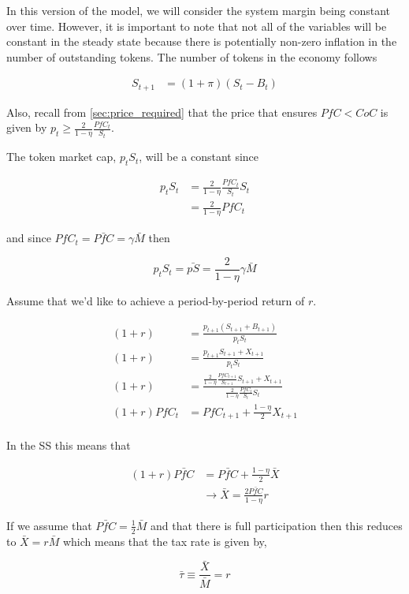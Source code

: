 
In this version of the model, we will consider the system margin being constant over time. However,
it is important to note that not all of the variables will be constant in the steady state because
there is potentially non-zero inflation in the number of outstanding tokens. The number of tokens in
the economy follows

\begin{align*}
  S_{t+1} &= (1 + \pi) (S_t - B_t)
\end{align*}

Also, recall from \ref{sec:price_required} that the price that ensures $PfC < CoC$ is given by
$p_t \geq \frac{2}{1 - \eta} \frac{PfC_t}{S_t}$.

The token market cap, $p_t S_t$, will be a constant since

\begin{align*}
  p_t S_t &= \frac{2}{1 - \eta} \frac{PfC_t}{S_t} S_t \\
  &= \frac{2}{1 - \eta} PfC_t
\end{align*}

and since $PfC_t = \bar{PfC} = \gamma \bar{M}$ then

$$p_t S_t = \bar{pS} = \frac{2}{1 - \eta} \gamma \bar{M}$$

Assume that we'd like to achieve a period-by-period return of $r$.

\begin{align*}
  (1 + r) &= \frac{p_{t+1} (S_{t+1} + B_{t+1})}{p_t S_t} \\
  (1 + r) &= \frac{p_{t+1} S_{t+1} + X_{t+1}}{p_t S_t} \\
  (1 + r) &= \frac{\frac{2}{1 - \eta} \frac{PfC_{t+1}}{S_{t+1}} S_{t+1} + X_{t+1}}{\frac{2}{1 - \eta} \frac{PfC_{t}}{S_t} S_t} \\
  (1 + r) PfC_{t} &= PfC_{t+1} + \frac{1 - \eta}{2} X_{t+1} \\
\end{align*}

In the SS this means that

\begin{align*}
  (1 + r) \bar{PfC} &= \bar{PfC} + \frac{1 - \eta}{2} \bar{X} \\
  &\rightarrow \bar{X} = \frac{2 \bar{PfC}}{1 - \eta} r
\end{align*}

If we assume that $\bar{PfC} = \frac{1}{2} \bar{M}$ and that there is full participation then this
reduces to $\bar{X} = r \bar{M}$ which means that the tax rate is given by,

$$\bar{\tau} \equiv \frac{\bar{X}}{\bar{M}} = r$$
